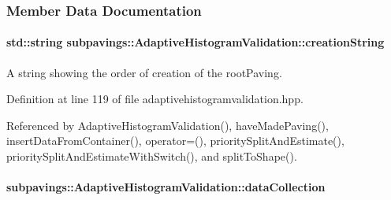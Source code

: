 \subsubsection{\-Member \-Data \-Documentation}
\hypertarget{classsubpavings_1_1AdaptiveHistogramValidation_a7d46cc6c04481f9579e9f5238ccea8b2}{
\paragraph[{creation\-String}]{\setlength{\rightskip}{0pt plus 5cm}std\-::string {\bf subpavings\-::\-Adaptive\-Histogram\-Validation\-::creation\-String}}}\label{classsubpavings_1_1AdaptiveHistogramValidation_a7d46cc6c04481f9579e9f5238ccea8b2}


\-A string showing the order of creation of the root\-Paving. 



\-Definition at line 119 of file adaptivehistogramvalidation.\-hpp.



\-Referenced by \-Adaptive\-Histogram\-Validation(), have\-Made\-Paving(), insert\-Data\-From\-Container(), operator=(), priority\-Split\-And\-Estimate(), priority\-Split\-And\-Estimate\-With\-Switch(), and split\-To\-Shape().

\hypertarget{classsubpavings_1_1AdaptiveHistogramValidation_acae18e51a5026807492d2109702c3c93}{
\paragraph[{data\-Collection}]{ {\bf subpavings\-::\-Adaptive\-Histogram\-Validation\-::data\-Collection}}}\label{classsubpavings_1_1AdaptiveHistogramValidation_acae18e51a5026807492d2109702c3c93}



